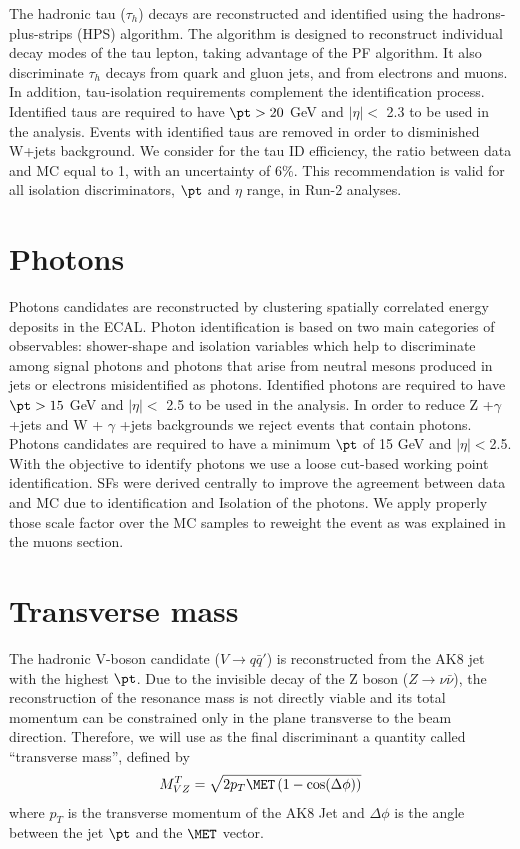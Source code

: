 The hadronic tau ($\tau_{h}$) decays are reconstructed and identified using the hadrons-plus-strips (HPS) algorithm. The algorithm is designed to reconstruct individual decay modes of the tau lepton, taking advantage of the PF algorithm. It also discriminate $\tau_{h}$ decays from quark and gluon jets, and from electrons and muons. In addition, tau-isolation requirements complement the identification process. Identified taus are required to have $\pt > 20$ GeV and $\left| \eta\right| <$ 2.3 to be used in the analysis.
Events with identified taus are removed in order to disminished W+jets background. We consider for the tau ID efficiency, the ratio between data and MC equal to 1, with an uncertainty of 6$\%$. This recommendation is valid for all isolation discriminators, $\pt$ and $\eta$ range, in Run-2 analyses. 


\section{Photons}\label{photons}

Photons candidates are reconstructed by clustering spatially correlated energy deposits in the ECAL. Photon identification is based on two main categories of observables: shower-shape and isolation variables which help to discriminate among signal photons and photons that arise from neutral mesons produced in jets or electrons misidentified as photons. Identified photons are required to have $\pt > 15$ GeV and $\left| \eta\right| <$ 2.5 to be used in the analysis. In order to reduce Z +$\gamma$ +jets and W + $\gamma$ +jets backgrounds  we reject events that contain photons.
Photons candidates are required to have a minimum $\pt$ of 15 GeV and $\left| \eta\right| < $2.5.
With the objective to identify photons we use a loose cut-based working point identification.
SFs were derived centrally to improve the agreement between data and MC due to identification and Isolation of the photons. We apply properly those scale factor over the MC samples to reweight the event as was explained in the muons section.

\section{Transverse mass}\label{MT}
The hadronic V-boson candidate ($V \rightarrow q \bar{q}'$) is reconstructed from the AK8 jet with the highest $\pt$. Due to the invisible decay of the Z boson ($Z \rightarrow \nu \bar{\nu}$), the reconstruction of the resonance mass is not directly viable and its total momentum can be constrained only in the plane transverse to the beam direction. Therefore, we will use as the final discriminant a quantity called ``transverse mass'', defined by
\begin{eqnarray*}
M_{VZ}^{T} = \sqrt{2 p_{T} \MET \left( 1-\cos(\Delta \phi)\right)}
\end{eqnarray*}
where $p_{T}$ is the transverse momentum of the AK8 Jet and $\Delta \phi$ is the angle between the jet $\pt$ and the $\MET$ vector.
